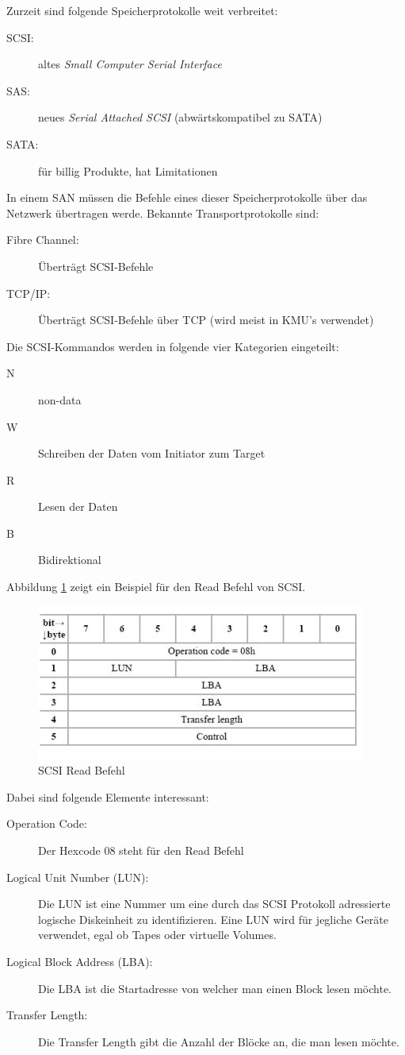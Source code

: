 Zurzeit sind folgende Speicherprotokolle weit verbreitet:
\begin{description}
	\item[SCSI:] altes \emph{Small Computer Serial Interface}
	\item[SAS:] neues \emph{Serial Attached SCSI} (abwärtskompatibel zu SATA)
	\item[SATA:] für billig Produkte, hat Limitationen
\end{description}
In einem SAN müssen die Befehle eines dieser Speicherprotokolle über das Netzwerk übertragen werde. Bekannte Transportprotokolle sind:
\begin{description}
	\item[Fibre Channel:] Überträgt SCSI-Befehle
	\item[TCP/IP:] Überträgt SCSI-Befehle über TCP (wird meist in KMU's verwendet)
\end{description}
Die SCSI-Kommandos werden in folgende vier Kategorien eingeteilt:
\begin{description}
	\item[N] non-data
	\item[W] Schreiben der Daten vom Initiator zum Target
	\item[R] Lesen der Daten
	\item[B] Bidirektional
\end{description}
Abbildung \ref{fig:scsi-read} zeigt ein Beispiel für den Read Befehl von SCSI. 

\begin{figure}[h!]
	\centering
	\includegraphics[width=0.7\linewidth]{fig/scsi-read}
	\caption{SCSI Read Befehl}
	\label{fig:scsi-read}
\end{figure}

\noindent
Dabei sind folgende Elemente interessant:
\begin{description}
	\item[Operation Code:] Der Hexcode 08 steht für den Read Befehl
	\item[Logical Unit Number (LUN):] Die LUN ist eine Nummer um eine durch das SCSI Protokoll adressierte logische Diskeinheit zu identifizieren. Eine LUN wird für jegliche Geräte verwendet, egal ob Tapes oder virtuelle Volumes.
	\item[Logical Block Address (LBA):] Die LBA ist die Startadresse von welcher man einen Block lesen möchte.
	\item[Transfer Length:] Die Transfer Length gibt die Anzahl der Blöcke an, die man lesen möchte.
\end{description}

